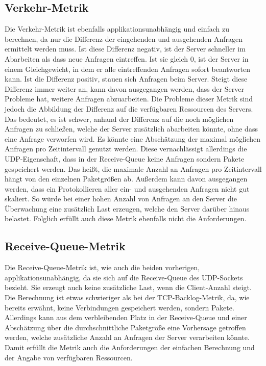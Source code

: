 \documentclass[a4paper, 12pt, BCOR10mm, DIV12, toc=bibliography, toc=listof, german]{scrbook}
\begin{document}

		\subsection*{Verkehr-Metrik} %

		Die Verkehr-Metrik ist ebenfalls applikationsunabhängig und einfach zu berechnen, da nur die
		Differenz der eingehenden und ausgehenden Anfragen ermittelt werden muss. Ist diese Differenz
		negativ, ist der Server schneller im Abarbeiten als dass neue Anfragen eintreffen. Ist sie
		gleich 0, ist der Server in einem Gleichgewicht, in dem er alle eintreffenden Anfragen sofort
		beantworten kann.  Ist die Differenz positiv, stauen sich Anfragen beim Server. Steigt diese
		Differenz immer weiter an, kann davon ausgegangen werden, dass der Server Probleme hat, weitere
		Anfragen abzuarbeiten. Die Probleme dieser Metrik sind jedoch die Abbildung der Differenz auf
		die verfügbaren Ressourcen des Servers. Das bedeutet, es ist schwer, anhand der Differenz auf
		die noch möglichen Anfragen zu schließen, welche der Server zusätzlich abarbeiten könnte, ohne
		dass eine Anfrage verworfen wird. Es könnte eine Abschätzung der maximal möglichen Anfragen pro
		Zeitintervall genutzt werden. Diese vernachlässigt allerdings die UDP-Eigenschaft, dass in der
		Receive-Queue keine Anfragen sondern Pakete gespeichert werden. Das heißt, die maximale Anzahl
		an Anfragen pro Zeitintervall hängt von den einzelnen Paketgrößen ab. Außerdem kann davon
		ausgegangen werden, dass ein Protokollieren aller ein- und ausgehenden Anfragen nicht gut
		skaliert. So würde bei einer hohen Anzahl von Anfragen an den Server die Überwachung eine
		zusätzlich Last erzeugen, welche den Server darüber hinaus belastet. Folglich erfüllt auch diese
		Metrik ebenfalls nicht die Anforderungen.


		\subsection*{Receive-Queue-Metrik} %

		Die Receive-Queue-Metrik ist, wie auch die beiden vorherigen, applikationsunabhängig, da sie
		sich auf die Receive-Queue des UDP-Sockets bezieht. Sie erzeugt auch keine zusätzliche Last,
		wenn die Client-Anzahl steigt. Die Berechnung ist etwas schwieriger als bei der
		TCP-Backlog-Metrik, da, wie bereits erwähnt, keine Verbindungen gespeichert werden, sondern
		Pakete. Allerdings kann aus dem verbleibenden Platz in der Receive-Queue und einer Abschätzung
		über die durchschnittliche Paketgröße eine Vorhersage getroffen werden, welche zusätzliche
		Anzahl an Anfragen der Server verarbeiten könnte. Damit erfüllt die Metrik auch die
		Anforderungen der einfachen Berechnung und der Angabe von verfügbaren Ressourcen.
\end{document}
